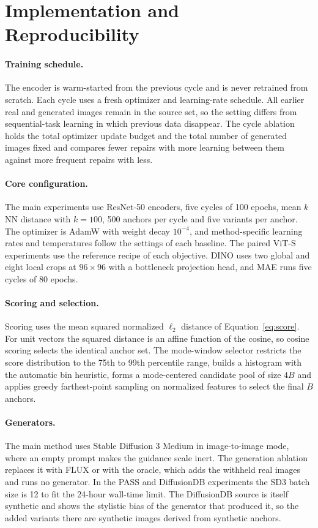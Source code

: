 \documentclass{article}
\begin{document}
\section{Implementation and Reproducibility}
\label{app:implementation}

\paragraph{Training schedule.} The encoder is warm-started from the previous cycle and is never retrained from scratch. Each cycle uses a fresh optimizer and learning-rate schedule. All earlier real and generated images remain in the source set, so the setting differs from sequential-task learning in which previous data disappear. The cycle ablation holds the total optimizer update budget and the total number of generated images fixed and compares fewer repairs with more learning between them against more frequent repairs with less.

\paragraph{Core configuration.}
The main experiments use ResNet-50 encoders, five cycles of 100 epochs, mean $k$NN distance with $k=100$, 500 anchors per cycle and five variants per anchor. The optimizer is AdamW with weight decay $10^{-4}$, and method-specific learning rates and temperatures follow the settings of each baseline. The paired ViT-S experiments use the reference recipe of each objective. DINO uses two global and eight local crops at $96\times96$ with a bottleneck projection head, and MAE runs five cycles of 80 epochs.

\paragraph{Scoring and selection.}
Scoring uses the mean squared normalized $\ell_2$ distance of Equation~\ref{eq:score}. For unit vectors the squared distance is an affine function of the cosine, so cosine scoring selects the identical anchor set. The mode-window selector restricts the score distribution to the 75th to 99th percentile range, builds a histogram with the automatic bin heuristic, forms a mode-centered candidate pool of size $4B$ and applies greedy farthest-point sampling on normalized features to select the final $B$ anchors.

\paragraph{Generators.}
The main method uses Stable Diffusion 3 Medium in image-to-image mode, where an empty prompt makes the guidance scale inert. The generation ablation replaces it with FLUX or with the oracle, which adds the withheld real images and runs no generator. In the PASS and DiffusionDB experiments the SD3 batch size is 12 to fit the 24-hour wall-time limit. The DiffusionDB source is itself synthetic and shows the stylistic bias of the generator that produced it, so the added variants there are synthetic images derived from synthetic anchors.
\end{document}

